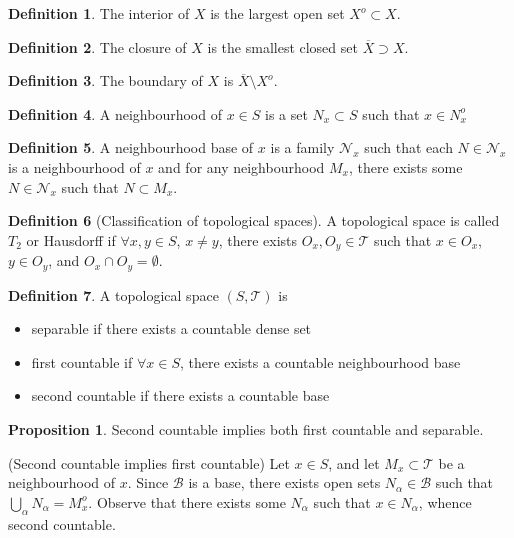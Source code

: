 \documentclass[11pt]{article}
\theoremstyle{definition}
\newtheorem{defn}{Definition}[section]
\newtheorem{prop}{Proposition}[section]
\newcommand{\sm}[0]{\setminus}
\newcommand{\m}[1]{\mathcal{#1}}
\begin{document}
\begin{defn}
The interior of $X$ is the largest open set $X^o\subset X$.
\end{defn}

\begin{defn}
The closure of $X$ is the smallest closed set $\overline{X}\supset X$.
\end{defn}

\begin{defn}
The boundary of $X$ is $\overline{X}\sm X^o$.
\end{defn}

\begin{defn}
A neighbourhood of $x\in S$ is a set $N_x\subset S$ such that $x\in N^o_x$
\end{defn}

\begin{defn}
A neighbourhood base of $x$ is a family $\m{N}_x$ such that each $N\in \m{N}_x$ is a
neighbourhood of $x$ and for any neighbourhood $M_x$, there exists some $N\in \m{N}_x$ such
that $N\subset M_x$.
\end{defn}

\begin{defn}[Classification of topological spaces]
A topological space is called $T_2$ or Hausdorff if $\forall x,y\in S$, $x\neq y$, there
exists $O_x,O_y\in\m{T}$ such that $x\in O_x$, $y\in O_y$, and $O_x\cap O_y = \emptyset$.
\end{defn}

\begin{defn}
A topological space $(S,\m{T})$ is
\begin{itemize}
\item separable if there exists a countable dense set
\item first countable if $\forall x\in S$, there exists a countable neighbourhood base
\item second countable if there exists a countable base
\end{itemize}
\end{defn}

\begin{prop}
Second countable implies both first countable and separable.
\end{prop}
\proof
(Second countable implies first countable)
Let $x\in S$, and let $M_x\subset\m{T}$ be a neighbourhood of $x$. Since $\m{B}$ is a base,
there exists open sets $N_\alpha\in\m{B}$ such that $\bigcup_\alpha N_\alpha = M_x^o$.
Observe that there exists some $N_\alpha$ such that $x\in N_\alpha$, whence second
countable.
\end{document}
